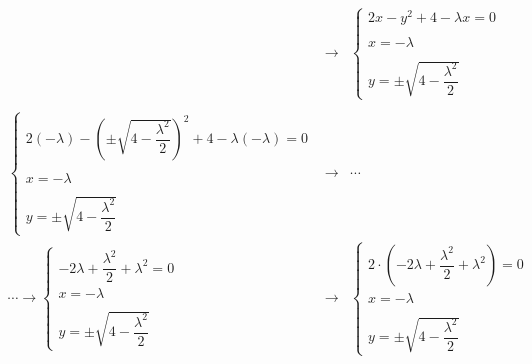 \documentclass[a4paper]{article}
\begin{document}
\begin{equation*}
\begin{array}{rcl}
			\\
			&\rightarrow&
			\begin{cases}
				2x - y^{2} + 4 - \lambda x = 0 \\
				\\
				x = -\lambda \\
				\\
				y = \pm \sqrt{4 - \dfrac{\lambda^{2}}{2}}
			\end{cases} \\
			\\
			\begin{cases}
				2\left(-\lambda\right) - \left(\pm \sqrt{4 - \dfrac{\lambda^{2}}{2}}\right)^{2} + 4 - \lambda \left(-\lambda\right) = 0 \\
				\\
				x = -\lambda \\
				\\
				y = \pm \sqrt{4 - \dfrac{\lambda^{2}}{2}}
			\end{cases}
			&\rightarrow& \cdots
			\\
			\cdots\rightarrow\begin{cases}
				-2\lambda + \dfrac{\lambda^{2}}{2} + \lambda^{2} = 0
				\\
				x = -\lambda \\
				\\
				y = \pm \sqrt{4 - \dfrac{\lambda^{2}}{2}}
			\end{cases}
			&\rightarrow&
			\begin{cases}
				2 \cdot \left(-2\lambda + \dfrac{\lambda^{2}}{2} + \lambda^{2}\right) = 0 
				\\
				x = -\lambda \\
				\\
				y = \pm \sqrt{4 - \dfrac{\lambda^{2}}{2}}
			\end{cases}
		\end{array}
	\end{equation*}\newpage
\end{document}
